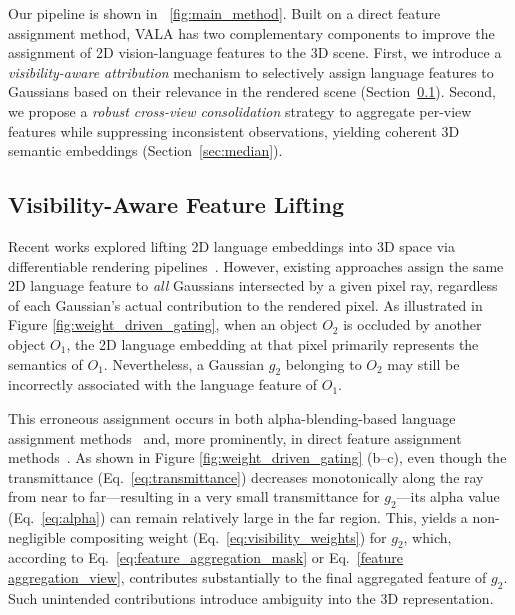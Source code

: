 Our pipeline is shown in \figureautorefname~\ref{fig:main_method}. Built on a direct feature assignment method, VALA has two complementary components to improve the assignment of 2D vision-language features to the 3D scene.
First, we introduce a \emph{visibility-aware attribution} mechanism to selectively assign language features to Gaussians based on their relevance in the rendered scene (Section~\ref{sec:gating}). 
Second, we propose a \emph{robust cross-view consolidation} strategy to aggregate per-view features while suppressing inconsistent observations, yielding coherent 3D semantic embeddings (Section~\ref{sec:median}).

\subsection{Visibility-Aware Feature Lifting}
\label{sec:gating}

Recent works explored lifting 2D language embeddings into 3D space via differentiable rendering pipelines~\cite{cheng2024occam,drsplat25}. However, existing approaches assign the same 2D language feature to \textit{all} Gaussians intersected by a given pixel ray, regardless of each Gaussian’s actual contribution to the rendered pixel. As illustrated in Figure \ref{fig:weight_driven_gating}, when an object $O_2$ is occluded by another object $O_1$, the 2D language embedding at that pixel primarily represents the semantics of $O_1$. Nevertheless, a Gaussian $g_2$ belonging to $O_2$ may still be incorrectly associated with the language feature of $O_1$.

This erroneous assignment occurs in both alpha-blending-based language assignment methods~\cite{qin2024langsplat, liang2024supergseg} and, more prominently, in direct feature assignment methods~\cite{wu2024opengaussian, cheng2024occam, drsplat25}. As shown in Figure \ref{fig:weight_driven_gating} (b–c), even though the transmittance (Eq.~\eqref{eq:transmittance}) decreases monotonically along the ray from near to far—resulting in a very small transmittance for $g_2$—its alpha value (Eq.~\eqref{eq:alpha}) can remain relatively large in the far region. This, yields a non-negligible compositing weight (Eq.~\eqref{eq:visibility_weights}) for $g_2$, which, according to Eq.~\eqref{eq:feature_aggregation_mask} or Eq.~\eqref{feature aggregation_view}, contributes substantially to the final aggregated feature of $g_2$. Such unintended contributions introduce ambiguity into the 3D representation.



